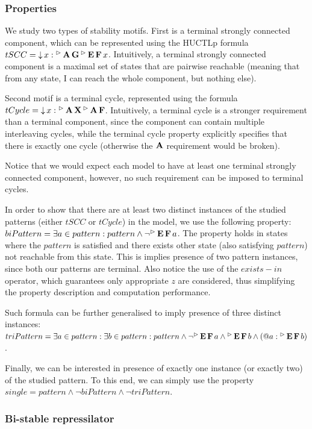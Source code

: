 \subsubsection{\textbf{Properties}}

We study two types of stability motifs. First is a terminal strongly connected component, which can be represented using the \ac{HUCTLp} formula $tSCC = \operatorname{\downarrow} x : {}^\vartriangleright\operatorname{\mathbf{A}}\operatorname{\mathbf{G}} {}^\vartriangleright\operatorname{\mathbf{E}}\operatorname{\mathbf{F}} x$. Intuitively, a terminal strongly connected component is a maximal set of states that are pairwise reachable (meaning that from any state, I can reach the whole component, but nothing else).

Second motif is a terminal cycle, represented using the formula $tCycle = \operatorname{\downarrow} x : {}^\vartriangleright\operatorname{\mathbf{A}}\operatorname{\mathbf{X}} {}^\vartriangleright\operatorname{\mathbf{A}}\operatorname{\mathbf{F}}$. Intuitively, a terminal cycle is a stronger requirement than a terminal component, since the component can contain multiple interleaving cycles, while the terminal cycle property explicitly specifies that there is exactly one cycle (otherwise the $\operatorname{\mathbf{A}}$ requirement would be broken).

Notice that we would expect each model to have at least one terminal strongly connected component, however, no such requirement can be imposed to terminal cycles.

In order to show that there are at least two distinct instances of the studied patterns (either $tSCC$ or $tCycle$) in the model, we use the following property: $biPattern = \exists a \in pattern : pattern \land \neg {}^\vartriangleright\operatorname{\mathbf{E}}\operatorname{\mathbf{F}} a$. The property holds in states where the $pattern$ is satisfied and there exists other state (also satisfying $pattern$) not reachable from this state. This is implies presence of two pattern instances, since both our patterns are terminal. Also notice the use of the $exists-in$ operator, which guarantees only appropriate $z$ are considered, thus simplifying the property description and computation performance. 

Such formula can be further generalised to imply presence of three distinct instances: $triPattern = \exists a \in pattern : \exists b \in pattern : pattern \land \neg {}^\vartriangleright\operatorname{\mathbf{E}}\operatorname{\mathbf{F}} a \land {}^\vartriangleright\operatorname{\mathbf{E}}\operatorname{\mathbf{F}} b \land (\operatorname{@\!} a : {}^\vartriangleright\operatorname{\mathbf{E}}\operatorname{\mathbf{F}} b)$. 

Finally, we can be interested in presence of exactly one instance (or exactly two) of the studied pattern. To this end, we can simply use the property $single = pattern \land \neg biPattern \land \neg triPattern$. 

\subsubsection{\textbf{Bi-stable repressilator}}

